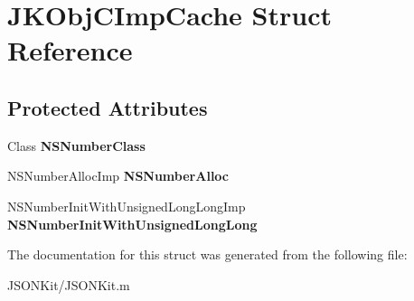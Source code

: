 \hypertarget{struct_j_k_obj_c_imp_cache}{\section{J\+K\+Obj\+C\+Imp\+Cache Struct Reference}
\label{struct_j_k_obj_c_imp_cache}
}
\subsection*{Protected Attributes}
\begin{DoxyCompactItemize}
\item 
\hypertarget{struct_j_k_obj_c_imp_cache_a2acfa5579ae2ce93cc41b3370622aac5}{Class {\bfseries N\+S\+Number\+Class}}\label{struct_j_k_obj_c_imp_cache_a2acfa5579ae2ce93cc41b3370622aac5}

\item 
\hypertarget{struct_j_k_obj_c_imp_cache_a2c83a6491469584a76b8da5672862f9f}{N\+S\+Number\+Alloc\+Imp {\bfseries N\+S\+Number\+Alloc}}\label{struct_j_k_obj_c_imp_cache_a2c83a6491469584a76b8da5672862f9f}

\item 
\hypertarget{struct_j_k_obj_c_imp_cache_afd030cfda65ff794d562320125fe8ecb}{N\+S\+Number\+Init\+With\+Unsigned\+Long\+Long\+Imp {\bfseries N\+S\+Number\+Init\+With\+Unsigned\+Long\+Long}}\label{struct_j_k_obj_c_imp_cache_afd030cfda65ff794d562320125fe8ecb}

\end{DoxyCompactItemize}


The documentation for this struct was generated from the following file\+:\begin{DoxyCompactItemize}
\item 
J\+S\+O\+N\+Kit/J\+S\+O\+N\+Kit.\+m\end{DoxyCompactItemize}
